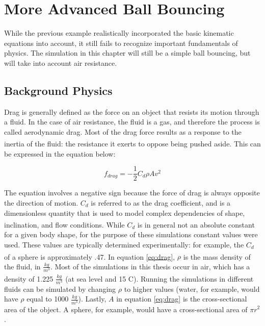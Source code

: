 \section{More Advanced Ball Bouncing}

While the previous example realistically incorporated the basic kinematic equations into account, it still fails to recognize important fundamentals of physics.  The simulation in this chapter will still be a simple ball bouncing, but will take into account air resistance.

\subsection{Background Physics}

Drag is generally defined as the force on an object that resists its motion through a fluid.  In the case of air resistance, the fluid is a gas, and therefore the process is called aerodynamic drag.  Most of the drag force results as a response to the inertia of the fluid: the resistance it exerts to oppose being pushed aside.\textsuperscript{\cite{universityphysics}}  This can be expressed in the equation below:

\begin{equation} \label{eq:drag}
f_{drag} = -\frac{1}{2}C_d \rho A v^2
\end{equation}

The equation involves a negative sign because the force of drag is always opposite the direction of motion.  $C_d$ is referred to as the drag coefficient, and is a dimensionless quantity that is used to model complex dependencies of shape, inclination, and flow conditions.\textsuperscript{\cite{universityphysics}}  While $C_d$ is in general not an absolute constant for a given body shape, for the purpose of these simulations constant values were used.  These values are typically determined experimentally: for example, the $C_d$ of a sphere is approximately .47.\textsuperscript{\cite{engineering}}  In equation \ref{eq:drag}, $\rho$ is the mass density of the fluid, in $\frac{kg}{m^3}$.  Most of the simulations in this thesis occur in air, which has a density of 1.225 $\frac{kg}{m^3}$  (at sea level and 15 \textdegree C).\textsuperscript{\cite{airfriction}}  Running the simulations in different fluids can be simulated by changing $\rho$ to higher values (water, for example, would have $\rho$ equal to 1000 $\frac{kg}{m^3}$).  Lastly, $A$ in equation \ref{eq:drag} is the cross-sectional area of the object.  A sphere, for example, would have a cross-sectional area of $\pi r^2 $. 

